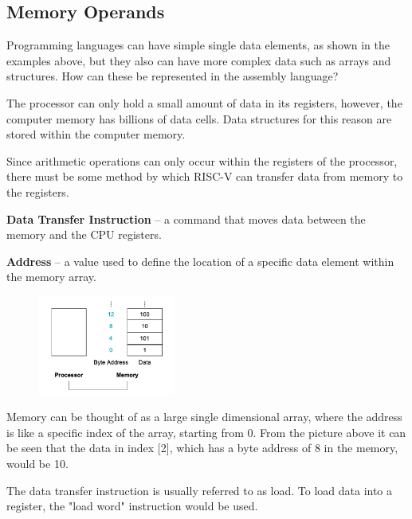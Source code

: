 \documentclass[12pt]{article}
\begin{document}
    \subsection*{Memory Operands}
    \par Programming languages can have simple single data elements, as shown
    in the examples above, but they also can have more complex data such as
    arrays and structures. How can these be represented in the assembly
    language?
    \par The processor can only hold a small amount of data in its registers,
    however, the computer memory has billions of data cells. Data structures for
    this reason are stored within the computer memory.
    \par Since arithmetic operations can only occur within the registers of the
    processor, there must be some method by which RISC-V can transfer data from
    memory to the registers.
    \par \textbf{Data Transfer Instruction} -- a command that moves data between
    the memory and the CPU registers.
    \par \textbf{Address} -- a value used to define the location of a specific
    data element within the memory array.
    \begin{figure}[h]
        \centering
        \includegraphics[width=0.4\textwidth]{Processor Memory Interaction.png}
    \end{figure}
    \par Memory can be thought of as a large single dimensional array, where the
    address is like a specific index of the array, starting from 0. From the
    picture above it can be seen that the data in index [2], which has a
    byte address of 8 in the memory, would be 10.
    \par The data transfer instruction is usually referred to as load. To
    load data into a register, the "load word" instruction would be used.
\end{document}
